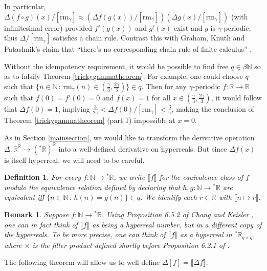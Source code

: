 \documentclass[microtype]{jloganal}
\newtheorem{remark}[theorem]{Remark}
\newtheorem{definition}[theorem]{Definition}
\def\RM{\mathrm{rm}}
\begin{document}
In particular,
$\Delta(f\circ g)(x)/[\RM_\gamma]
\approx
(\Delta f(g(x))/[\RM_\gamma])(\Delta g(x)/[\RM_\gamma])$
(with infinitesimal error)
provided $f'(g(x))$ and $g'(x)$ exist and $g$ is $\gamma$-periodic;
thus $\Delta/[\RM_\gamma]$
satisfies a chain rule. Contrast this with Graham, Knuth and Patashnik's
claim that ``there's no corresponding chain rule of finite calculus''
\cite{concrete}.

Without the idempotency requirement, it would be possible to find
free $q\in\beta\mathbb N$ so as to falsify Theorem \ref{trickygammatheorem}.
For example, one could choose $q$ such that
$\{n\in\mathbb N\,:\,\RM_\gamma(n)\in (\frac\gamma3,\frac{2\gamma}3)\}\in q$.
Then for any $\gamma$-periodic $f:\mathbb R\to\mathbb R$
such that $f(0)=f'(0)=0$ and $f(x)=1$ for all $x\in (\frac\gamma3,\frac{2\gamma}3)$,
it would follow that $\Delta f(0)=1$, implying
$\frac3{2\gamma}<\Delta f(0)/[\RM_\gamma]< \frac3\gamma$,
making the conclusion of
Theorem \ref{trickygammatheorem} (part 1) impossible at $x=0$.

As in Section \ref{mainsection}, we would like to transform the
derivative operation $\Delta:\mathbb R^\mathbb R\to ({}^*\mathbb R)^{\mathbb R}$
into a well-defined derivative on hyperreals.
But since $\Delta f(x)$ is itself hyperreal,
we will need to be careful.

\begin{definition}
\label{hyperhyperrealsdefn}
    For every $f:\mathbb N\to {}^*\mathbb R$, we write
    $\llbracket f\rrbracket$ for the equivalence class of
    $f$ modulo the equivalence relation defined by declaring
    that $h,g:\mathbb N\to {}^*\mathbb R$ are equivalent
    iff $\{n\in\mathbb N\,:\,h(n)=g(n)\}\in q$.
    We identify each $r\in\mathbb R$ with $\llbracket n\mapsto r\rrbracket$.
\end{definition}

\begin{remark}
\label{iteratedultrafilterremark}
    Suppose $f:\mathbb N\to{}^*\mathbb R$.
    Using Proposition 6.5.2 of Chang and Keisler \cite{chang1990model},
    one can in fact think of $\llbracket f\rrbracket$ as being a
    hyperreal number, but in a different copy of the hyperreals.
    To be more precise, one can think of $\llbracket f\rrbracket$
    as a hyperreal in ${}^*\mathbb R_{q\times q}$, where $\times$ is the
    filter product defined shortly before Proposition 6.2.1
    of \cite{chang1990model}.
\end{remark}

The following theorem will allow us to well-define
$\Delta [f]=\llbracket\Delta f\rrbracket$.
\end{document}
